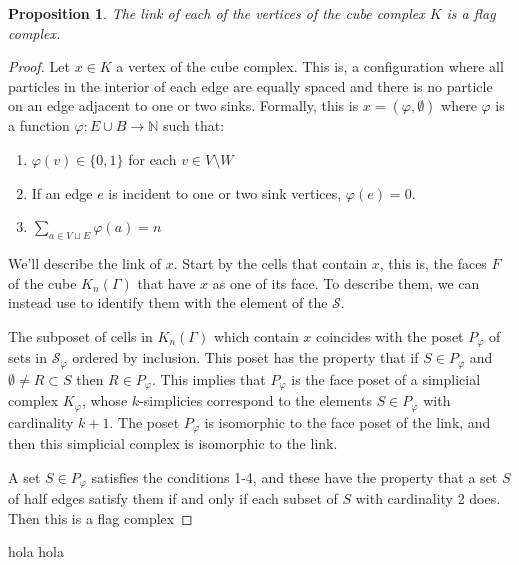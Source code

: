 \documentclass{article}
\newtheorem{proposition}{Proposition}
\begin{document}
\begin{proposition}
    The link of each of the vertices of the cube complex $K$ is a flag complex.
\end{proposition}
\begin{proof}
    Let $x\in K$ a vertex of the cube complex. This is, a configuration where all particles in the interior of each edge are equally spaced and there is no particle on an edge adjacent to one or two sinks. Formally, this is $x= (\varphi, \emptyset)$ where $\varphi$ is a function $\varphi: E\cup B\to \mathbb{N}$ such that:
    \begin{enumerate}
        \item[(a)] $\varphi(v)\in \{0,1\}$ for each $v\in V\setminus W$ 
        \item[(b)] If an edge $e$ is incident to one or two sink vertices, $\varphi(e)=0$.
        \item[(c)] $\sum_{a\in V \sqcup E} \varphi(a) = n$
    \end{enumerate}
    We'll describe the link of $x$. Start by the cells that contain $x$, this is, the faces $F$ of the cube $K_n(\mathsf{\Gamma})$ that have $x$ as one of its face. To describe them, we can instead use  to identify them with the element of the $\mathcal{S}$.
  

    The subposet of cells in $K_n(\mathsf{\Gamma})$ which contain $x$ coincides with the poset $P_{\varphi}$ of sets in $\mathcal{S}_{\varphi}$ ordered by inclusion. This poset has the property that if $S\in P_{\varphi}$ and $\emptyset \neq R\subset S$ then $R\in P_{\varphi}$. This implies that $P_{\varphi}$ is the face poset of a simplicial complex $K_{\varphi}$, whose $k$-simplicies correspond to  the elements $S\in P_{\varphi}$ with cardinality $k+1$. The poset $P_{\varphi}$ is isomorphic to the face poset of the link, and then this simplicial complex is isomorphic to the link.

     A set $S\in P_{\varphi}$ satisfies the conditions 1-4, and these have the property that a set $S$ of half edges satisfy them if and only if each subset of $S$ with cardinality 2 does. Then this is a flag complex
\end{proof}
hola
hola
\end{document}

